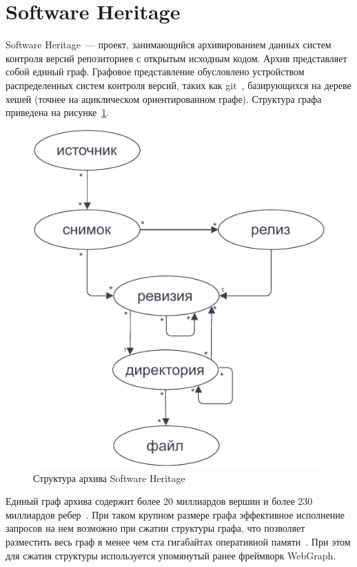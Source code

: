 \documentclass[times,specification,annotation]{itmo-student-thesis}
\begin{document}
\section{Software Heritage}

Software Heritage~--- проект, занимающийся архивированием данных систем контроля версий репозиториев с открытым исходным кодом. Архив представляет собой единый граф. Графовое представление обусловлено устройством распределенных систем контроля версий, таких как git~\cite{git}, базирующихся на дереве хешей (точнее на ациклическом ориентированном графе). Структура графа приведена на рисунке~\ref{fig1}.

\begin{figure}[!h]
\caption{Структура архива Software Heritage}\label{fig1}
\centering
\includegraphics{img/swh-graph-structure.pdf}
\end{figure}

Единый граф архива содержит более 20 миллиардов вершин и более 230 миллиардов ребер~\cite{swh-dataset}. При таком крупном размере графа эффективное исполнение запросов на нем возможно при сжатии структуры графа, что позволяет разместить весь граф в менее чем ста гигабайтах оперативной памяти~\cite{saner}. При этом для сжатия структуры используется упомянутый ранее фреймворк WebGraph.
\end{document}
